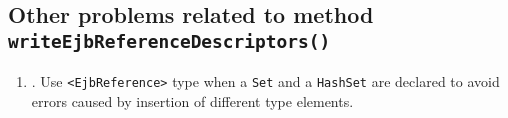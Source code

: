\subsection{Other problems related to method \texttt{writeEjbReferenceDescriptors()}}
\begin{enumerate}
\item {}. Use \texttt{<EjbReference>} type when a \texttt{Set} and a \texttt{HashSet} are declared to avoid errors caused by insertion of different type elements.
\end{enumerate}
